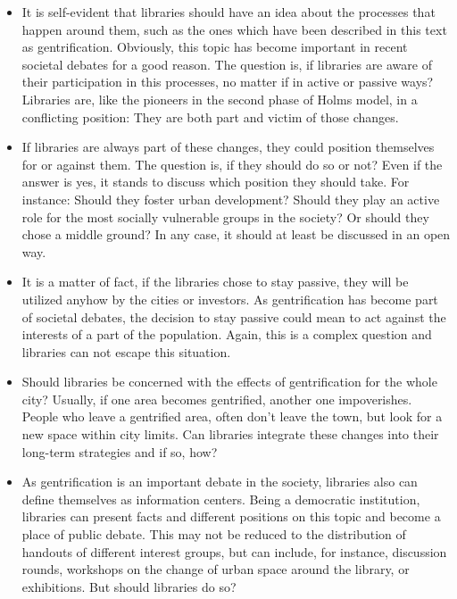 \documentclass[a4paper,
fontsize=11pt,
oneside,
numbers=noperiodatend,
parskip=half-,
bibliography=totoc,
final
]{scrartcl}
\begin{document}
\begin{itemize}
\item
  It is self-evident that libraries should have an idea about the
  processes that happen around them, such as the ones which have been
  described in this text as gentrification. Obviously, this topic has
  become important in recent societal debates for a good reason. The
  question is, if libraries are aware of their participation in this
  processes, no matter if in active or passive ways? Libraries are, like
  the pioneers in the second phase of Holms model, in a conflicting
  position: They are both part and victim of those changes.
\item
  If libraries are always part of these changes, they could position
  themselves for or against them. The question is, if they should do so
  or not? Even if the answer is yes, it stands to discuss which position
  they should take. For instance: Should they foster urban development?
  Should they play an active role for the most socially vulnerable
  groups in the society? Or should they chose a middle ground? In any
  case, it should at least be discussed in an open way.
\item
  It is a matter of fact, if the libraries chose to stay passive, they
  will be utilized anyhow by the cities or investors. As gentrification
  has become part of societal debates, the decision to stay passive
  could mean to act against the interests of a part of the population.
  Again, this is a complex question and libraries can not escape this
  situation.
\item
  Should libraries be concerned with the effects of gentrification for
  the whole city? Usually, if one area becomes gentrified, another one
  impoverishes. People who leave a gentrified area, often don't leave
  the town, but look for a new space within city limits. Can libraries
  integrate these changes into their long-term strategies and if so,
  how?
\item
  As gentrification is an important debate in the society, libraries
  also can define themselves as information centers. Being a democratic
  institution, libraries can present facts and different positions on
  this topic and become a place of public debate. This may not be
  reduced to the distribution of handouts of different interest groups,
  but can include, for instance, discussion rounds, workshops on the
  change of urban space around the library, or exhibitions. But should
  libraries do so?
\end{itemize}
\end{document}
